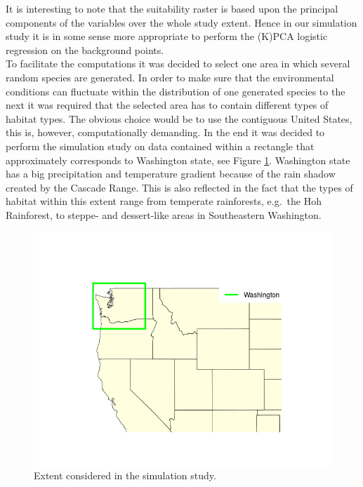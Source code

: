 It is interesting to note that the suitability raster is based upon the principal components of the variables over the whole study extent. Hence in our simulation study it is in some sense more appropriate to perform the (K)PCA logistic regression on the background points. \\

To facilitate the computations it was decided to select one area in which several random species are generated. In order to make sure that the environmental conditions can fluctuate within the distribution of one generated species to the next it was required that the selected area has to contain different types of habitat types. The obvious choice would be to use the contiguous United States, this is, however, computationally demanding. In the end it was decided to perform the simulation study on data contained within a rectangle that approximately corresponds to Washington state, see Figure \ref{fig:WashState}. Washington state has a big precipitation and temperature gradient because of the rain shadow created by the Cascade Range. This is also reflected in the fact that the types of habitat within this extent range from temperate rainforests, e.g.\ the Hoh Rainforest, to steppe- and dessert-like areas in Southeastern Washington.

\begin{figure}[!htb]
\center
\includegraphics[scale=0.5]{Plots/WashingtonPlot.png}
\caption{\label{fig:WashState}Extent considered in the simulation study.}
\end{figure}

